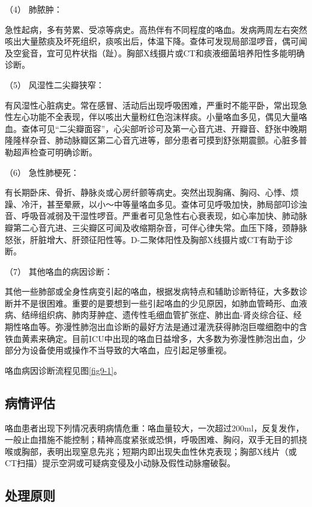 \hypertarget{text00024.htmlux5cux23CHP1-9-2-5-4}{}
（4） 肺脓肿：

急性起病，多有劳累、受凉等病史。高热伴有不同程度的咯血。发病两周左右突然咳出大量脓痰及坏死组织，痰咳出后，体温下降。查体可发现局部湿啰音，偶可闻及空瓮音，宜可见杵状指（趾）。胸部X线摄片或CT和痰液细菌培养阳性多能明确诊断。

\hypertarget{text00024.htmlux5cux23CHP1-9-2-5-5}{}
（5） 风湿性二尖瓣狭窄：

有风湿性心脏病史。常在感冒、活动后出现呼吸困难，严重时不能平卧，常出现急性左心功能不全表现，伴以咳出大量粉红色泡沫样痰。小量咯血多见，偶见大量咯血。查体可见“二尖瓣面容”，心尖部听诊可及第一心音亢进、开瓣音、舒张中晚期隆隆样杂音、肺动脉瓣区第二心音亢进等，部分患者可摸到舒张期震颤。心脏多普勒超声检查可明确诊断。

\hypertarget{text00024.htmlux5cux23CHP1-9-2-5-6}{}
（6） 急性肺梗死：

有长期卧床、骨折、静脉炎或心房纤颤等病史。突然出现胸痛、胸闷、心悸、烦躁、冷汗，甚至晕厥，以小～中等量咯血多见。查体可见呼吸加快，肺局部叩诊浊音、呼吸音减弱及干湿性啰音。严重者可见急性右心衰表现，如心率加快、肺动脉瓣第二心音亢进、三尖瓣区可闻及收缩期杂音，可伴心律失常。血压下降，颈静脉怒张，肝脏增大、肝颈征阳性等。D-二聚体阳性及胸部X线摄片或CT有助于诊断。

\hypertarget{text00024.htmlux5cux23CHP1-9-2-5-7}{}
（7） 其他咯血的病因诊断：

其他一些肺部或全身性病变引起的咯血，根据发病特点和辅助诊断特征，大多数诊断并不是很困难。重要的是要想到一些引起咯血的少见原因，如肺血管畸形、血液病、结缔组织病、肺肉芽肿症、遗传性毛细血管扩张症、肺出血-肾炎综合征、经期性咯血等。弥漫性肺泡出血诊断的最好方法是通过灌洗获得肺泡巨噬细胞中的含铁血黄素来确定。目前ICU中出现的咯血日益增多，大多数为弥漫性肺泡出血，少部分为设备使用或操作不当导致的大咯血，应引起足够重视。

咯血病因诊断流程见图\ref{fig9-1}。

\subsection{病情评估}

咯血患者出现下列情况表明病情危重：咯血量较大，一次超过200ml，反复发作，一般止血措施不能控制；精神高度紧张或恐惧，呼吸困难、胸闷，双手无目的抓挠喉或胸部，表明出现窒息先兆；短期内即出现失血性休克表现；胸部X线片（或CT扫描）提示空洞或可疑病变侵及小动脉及假性动脉瘤破裂。

\subsection{处理原则}

